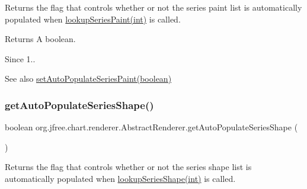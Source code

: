 Returns the flag that controls whether or not the series paint list is automatically populated when \mbox{\hyperlink{classorg_1_1jfree_1_1chart_1_1renderer_1_1_abstract_renderer_abc231547c7d2059d6158ac21bb5826cf}{lookup\+Series\+Paint(int)}} is called.

\begin{DoxyReturn}{Returns}
A boolean.
\end{DoxyReturn}
\begin{DoxySince}{Since}
1..
\end{DoxySince}
\begin{DoxySeeAlso}{See also}
\mbox{\hyperlink{classorg_1_1jfree_1_1chart_1_1renderer_1_1_abstract_renderer_a2ae58cd16b4f7c6f6b741bf47a5af5fb}{set\+Auto\+Populate\+Series\+Paint(boolean)}} 
\end{DoxySeeAlso}
\mbox{\label{classorg_1_1jfree_1_1chart_1_1renderer_1_1_abstract_renderer_ad675c5f6d25fc7e964ce4d64fdd3225d}} 
\subsubsection{\texorpdfstring{get\+Auto\+Populate\+Series\+Shape()}{getAutoPopulateSeriesShape()}}
{\footnotesize\ttfamily boolean org.\+jfree.\+chart.\+renderer.\+Abstract\+Renderer.\+get\+Auto\+Populate\+Series\+Shape (\begin{DoxyParamCaption}{ }\end{DoxyParamCaption})}

Returns the flag that controls whether or not the series shape list is automatically populated when \mbox{\hyperlink{classorg_1_1jfree_1_1chart_1_1renderer_1_1_abstract_renderer_ac5a0b8a1c0dea1813cfbbf36e7cbbd10}{lookup\+Series\+Shape(int)}} is called.

